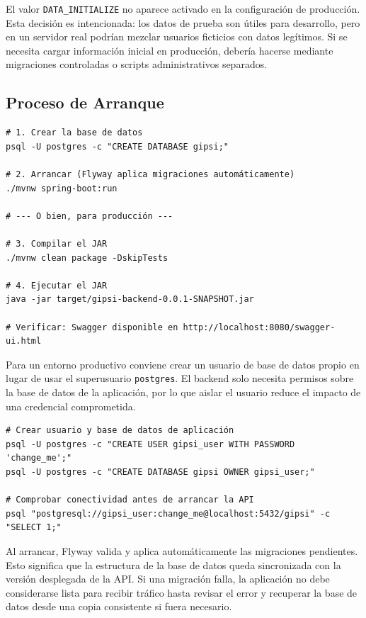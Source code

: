 \documentclass[12pt,a4paper,twoside]{report}
\begin{document}
El valor \texttt{DATA\_INITIALIZE} no aparece activado en la configuración de
producción. Esta decisión es intencionada: los datos de prueba son útiles para
desarrollo, pero en un servidor real podrían mezclar usuarios ficticios con
datos legítimos. Si se necesita cargar información inicial en producción,
debería hacerse mediante migraciones controladas o scripts administrativos
separados.

\subsection{Proceso de Arranque}

\begin{lstlisting}[style=yamlStyle, caption={Comandos de arranque del backend}, label={lst:arranque-backend}]
# 1. Crear la base de datos
psql -U postgres -c "CREATE DATABASE gipsi;"

# 2. Arrancar (Flyway aplica migraciones automáticamente)
./mvnw spring-boot:run

# --- O bien, para producción ---

# 3. Compilar el JAR
./mvnw clean package -DskipTests

# 4. Ejecutar el JAR
java -jar target/gipsi-backend-0.0.1-SNAPSHOT.jar

# Verificar: Swagger disponible en http://localhost:8080/swagger-ui.html
\end{lstlisting}

Para un entorno productivo conviene crear un usuario de base de datos propio en
lugar de usar el superusuario \texttt{postgres}. El backend solo necesita
permisos sobre la base de datos de la aplicación, por lo que aislar el usuario
reduce el impacto de una credencial comprometida.

\begin{lstlisting}[style=yamlStyle, caption={Preparación recomendada de PostgreSQL}, label={lst:postgres-produccion}]
# Crear usuario y base de datos de aplicación
psql -U postgres -c "CREATE USER gipsi_user WITH PASSWORD 'change_me';"
psql -U postgres -c "CREATE DATABASE gipsi OWNER gipsi_user;"

# Comprobar conectividad antes de arrancar la API
psql "postgresql://gipsi_user:change_me@localhost:5432/gipsi" -c "SELECT 1;"
\end{lstlisting}

Al arrancar, Flyway valida y aplica automáticamente las migraciones pendientes.
Esto significa que la estructura de la base de datos queda sincronizada con la
versión desplegada de la API. Si una migración falla, la aplicación no debe
considerarse lista para recibir tráfico hasta revisar el error y recuperar la
base de datos desde una copia consistente si fuera necesario.
\end{document}
